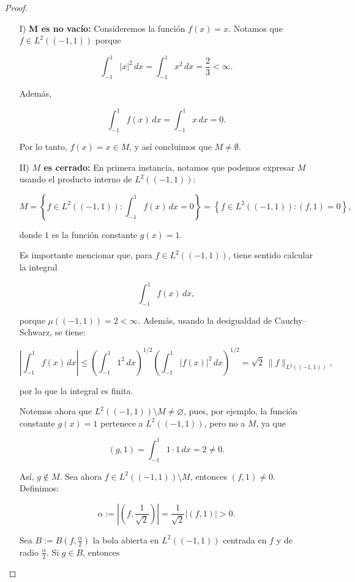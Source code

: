 \begin{itemize}
 \begin{proof}
    \hfill
        \begin{enumerate}
            \item[I)]\textbf{M es no vacío:} Consideremos la función \( f(x) = x \). Notamos que \( f \in L^2((-1,1)) \) porque

\[
\int_{-1}^1 |x|^2\, dx = \int_{-1}^1 x^2\, dx = \frac{2}{3} < \infty.
\]

Además,

\[
\int_{-1}^1 f(x)\, dx = \int_{-1}^1 x\, dx = 0.
\]

Por lo tanto, \( f(x) = x \in M \), y así concluimos que \( M \neq \emptyset \).
\item[II)] \textbf{\( M \) es cerrado:} En primera instancia, notamos que podemos expresar \( M \) usando el producto interno de \( L^2((-1,1)) \):

\[
M = \left\{ f \in L^2((-1,1)) : \int_{-1}^1 f(x)\, dx = 0 \right\} = \left\{ f \in L^2((-1,1)) : (f, 1) = 0 \right\},
\]

donde \( 1 \) es la función constante \( g(x) = 1 \).

Es importante mencionar que, para \( f \in L^2((-1,1)) \), tiene sentido calcular la integral

\[
\int_{-1}^1 f(x)\, dx,
\]

porque \( \mu((-1,1)) = 2 < \infty \). Además, usando la desigualdad de Cauchy–Schwarz, se tiene:

\[
\left| \int_{-1}^1 f(x)\, dx \right| \leq \left( \int_{-1}^1 1^2\, dx \right)^{1/2} \left( \int_{-1}^1 |f(x)|^2\, dx \right)^{1/2} = \sqrt{2} \, \|f\|_{L^2((-1,1))},
\]

por lo que la integral es finita.

Notemos ahora que \( L^2((-1,1)) \setminus M \neq \varnothing \), pues, por ejemplo, la función constante \( g(x) = 1 \) pertenece a \( L^2((-1,1)) \), pero no a \( M \), ya que

\[
(g, 1) = \int_{-1}^1 1 \cdot 1\, dx = 2 \neq 0.
\]

Así, \( g \notin M \). Sea ahora \( f \in L^2((-1,1)) \setminus M \), entonces \( (f,1) \neq 0 \). Definimos:

\[
\alpha := \left| \left( f, \frac{1}{\sqrt{2}} \right) \right| = \frac{1}{\sqrt{2}} |(f,1)| > 0.
\]

Sea \( B := B(f, \frac{\alpha}{2}) \) la bola abierta en \( L^2((-1,1)) \) centrada en \( f \) y de radio \( \frac{\alpha}{2} \). Si \( g \in B \), entonces


\end{enumerate}
\end{proof}
\end{itemize}
